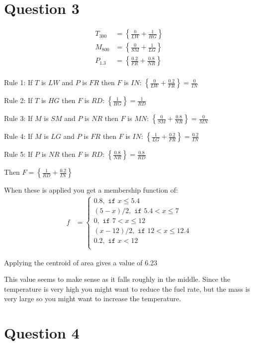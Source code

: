 \documentclass[12pt,a4paper]{article}
\begin{document}
\section*{Question 3}
\label{sec:question_3}
\begin{align*}
	T_{300} &= \left\{\frac{0}{LW} + \frac{1}{HG}\right\} \\
	M_{800} &= \left\{\frac{0}{SM} + \frac{1}{LG}\right\} \\
	P_{1.3} &= \left\{\frac{0.2}{FR} + \frac{0.8}{NR}\right\} \\
\end{align*}

Rule 1: If $T$ is $LW$ and $P$ is $FR$ then $F$ is $IN$: $\left \{ \frac{0}{LW} + \frac{0.2}{FR}\right\} = \frac{0}{IN}$

Rule 2: If $T$ is $HG$ then $F$ is $RD$: $\left \{ \frac{1}{HG} \right \} = \frac{1}{RD}$

Rule 3: If $M$ is $SM$ and $P$ is $NR$ then $F$ is $MN$: $\left \{ \frac{0}{SM} + \frac{0.8}{NR} \right \} = \frac{0}{MN}$

Rule 4: If $M$ is $LG$ and $P$ is $FR$ then $F$ is $IN$: $\left \{ \frac{1}{LG} + \frac{0.2}{FR} \right \} = \frac{0.2}{IN}$

Rule 5: If $P$ is $NR$ then $F$ is $RD$: $\left \{ \frac{0.8}{NR} \right \} = \frac{0.8}{RD}$

Then $F = \left \{ \frac{1}{RD} + \frac{0.2}{IN}\right \}$

When these is applied you get a membership function of:
\begin{align}
	f &= \begin{cases}
		0.8, \texttt{ if } x \leq 5.4\\
		(5-x)/2, \texttt{ if } 5.4 < x \leq 7\\
		0, \texttt{ if } 7 < x \leq 12\\
		(x-12)/2, \texttt{ if } 12 < x \leq 12.4\\
		0.2, \texttt{ if } x < 12\\
	\end{cases}
\end{align}

Applying the centroid of area gives a value of 6.23

This value seems to make sense as it falls roughly in the middle. Since the temperature is very high you might want to reduce the fuel rate, but the mass is very large so you might want to increase the temperature.


\section*{Question 4}
\label{sec:question_4}
\end{document}
